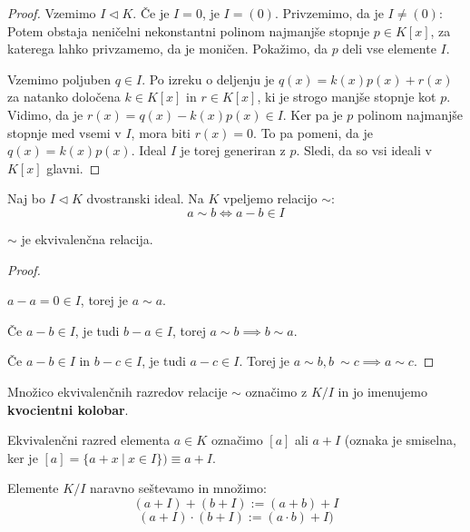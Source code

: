 \documentclass[11pt, a4paper]{article}
\begin{document}
    \begin{proof}
        Vzemimo \(I \triangleleft K\). Če je \(I = {0}\), je \(I = (0)\). Privzemimo, da je \(I \neq (0)\): Potem obstaja neničelni nekonstantni polinom najmanjše stopnje \(p \in K[x]\), za katerega lahko privzamemo, da je moničen. Pokažimo, da \(p\) deli vse elemente \(I\).
        \par
        Vzemimo poljuben \(q \in I\). Po izreku o deljenju je \(q(x) = k(x) p(x) + r(x)\) za natanko določena \(k \in K[x]\) in \(r \in K[x]\), ki je strogo manjše stopnje kot \(p\). Vidimo, da je \(r(x) = q(x) - k(x) p(x) \in I\). Ker pa je \(p\) polinom najmanjše stopnje med vsemi v \(I\), mora biti \(r(x) = 0\). To pa pomeni, da je \(q(x) = k(x)p(x)\). Ideal \(I\) je torej generiran z \(p\). Sledi, da so vsi ideali v \(K[x]\) glavni.
    \end{proof}


    Naj bo \(I \triangleleft K\) dvostranski ideal. Na \(K\) vpeljemo relacijo \(\sim\):
    \[a \sim b \Longleftrightarrow a - b \in I\]

    \begin{proposition}
        \(\sim\) je ekvivalenčna relacija.
    \end{proposition}

    \begin{proof}
        \(\)\par
        \(a - a = 0 \in I\), torej je \(a \sim a\).
        \par
        Če \(a - b \in I\), je tudi \(b - a \in I\), torej \(a \sim b \implies b \sim a\).
        \par
        Če \(a - b \in I\) in \(b - c \in I\), je tudi \(a - c \in I\). Torej je \(a \sim b, b\ \sim c \implies a \sim c\).
    \end{proof}

    \begin{definition}
        Množico ekvivalenčnih razredov relacije \(\sim\) označimo z \(K / I\) in jo imenujemo \textbf{kvocientni kolobar}. 
    \end{definition}

    Ekvivalenčni razred elementa \(a \in K\) označimo \([a]\) ali \(a + I\) (oznaka je smiselna, ker je \([a] = \{a + x\ |\ x \in I\}) \equiv a + I\).

    \par
    Elemente \(K / I\) naravno seštevamo in množimo:
    \[(a+I) + (b+I) := (a+b) + I\]
    \[(a+I) \cdot (b+I) := (a \cdot b) + I)\]
\end{document}

